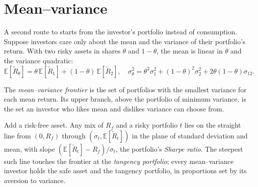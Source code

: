 \section{Mean--variance}\label{sec:b2:asset-prices:mean-variance}

A second route to  starts from the investor's portfolio instead of consumption. Suppose
investors care only about the mean and the variance of their portfolio's return. With two risky assets
in shares $\theta$ and $1 - \theta$, the mean is linear in $\theta$ and the variance quadratic:
\[
\mathbb{E}[\tilde R_\theta] = \theta\,\mathbb{E}[\tilde R_1] + (1 - \theta)\,\mathbb{E}[\tilde R_2], \quad
\sigma^2_\theta = \theta^2\sigma_1^2 + (1 - \theta)^2\sigma_2^2 + 2\theta(1 - \theta)\sigma_{12}.
\]

\begin{definition}\label{def:b2:asset-prices:frontier}
The \emph{mean--variance frontier} is the set of portfolios with the
smallest variance for each mean return. Its upper branch, above the portfolio of minimum variance, is
the set an investor who likes mean and dislikes variance can choose from.
\end{definition}

Add a risk-free asset. Any mix of $R_f$ and a risky portfolio $t$ lies on the straight line from $(0,
R_f)$ through $(\sigma_t, \mathbb{E}[\tilde R_t])$ in the plane of standard deviation and mean, with
slope $(\mathbb{E}[\tilde R_t] - R_f)/\sigma_t$, the portfolio's \emph{Sharpe ratio}. The steepest such
line touches the frontier at the \emph{tangency portfolio}; every mean--variance investor holds the
safe asset and the tangency portfolio, in proportions set by its aversion to variance.

